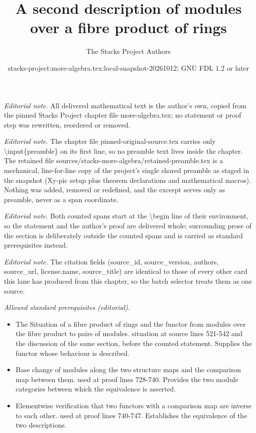 \documentclass[10pt,a4paper]{amsart}
\title{A second description of modules over a fibre product of rings}
\author{The Stacks Project Authors}
\date{stacks-project:more-algebra.tex:local-snapshot-20261012; GNU FDL 1.2 or later}
\theoremstyle{plain}
\theoremstyle{definition}
\theoremstyle{remark}
\numberwithin{equation}{subsection}
\begin{document}
\maketitle
\setcounter{subsection}{1}
\noindent\textit{Editorial note.} All delivered mathematical text is the author's own, copied from the pinned Stacks Project chapter file more-algebra.tex; no statement or proof step was rewritten, reordered or removed.\par\medskip
\noindent\textit{Editorial note.} The chapter file pinned-original-source.tex carries only \textbackslash{}input\{preamble\} on its first line, so no preamble text lives inside the chapter. The retained file sources/stacks-more-algebra/retained-preamble.tex is a mechanical, line-for-line copy of the project's single shared preamble as staged in the snapshot (Xy-pic setup plus theorem declarations and mathematical macros). Nothing was added, removed or redefined, and the excerpt serves only as preamble, never as a span coordinate.\par\medskip
\noindent\textit{Editorial note.} Both counted spans start at the \textbackslash{}begin line of their environment, so the statement and the author's proof are delivered whole; surrounding prose of the section is deliberately outside the counted spans and is carried as standard prerequisites instead.\par\medskip
\noindent\textit{Editorial note.} The citation fields (source\_id, source\_version, authors, source\_url, license.name, source\_title) are identical to those of every other card this lane has produced from this chapter, so the batch selector treats them as one source.\par\medskip
\noindent\textit{Allowed standard prerequisites (editorial).}\begin{itemize}
\item The Situation of a fibre product of rings and the functor from modules over the fibre product to pairs of modules. situation at source lines 521-542 and the discussion of the same section, before the counted statement. Supplies the functor whose behaviour is described.
\item Base change of modules along the two structure maps and the comparison map between them. used at proof lines 728-740. Provides the two module categories between which the equivalence is asserted.
\item Elementwise verification that two functors with a comparison map are inverse to each other. used at proof lines 740-747. Establishes the equivalence of the two descriptions.
\end{itemize}\medskip
\end{document}
